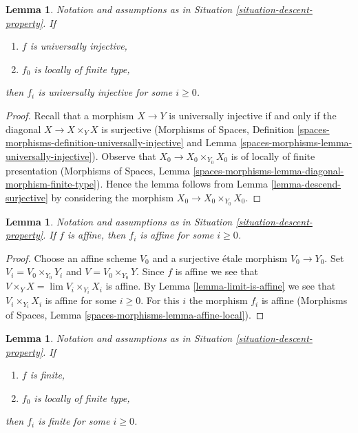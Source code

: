 \documentclass{stacks-project}
\theoremstyle{plain}
\newtheorem{lemma}[subsection]{Lemma}
\theoremstyle{definition}
\theoremstyle{remark}
\numberwithin{equation}{subsection}
\def\lim{\mathop{\mathrm{lim}}\nolimits}
\begin{document}
\begin{lemma}
\label{lemma-descend-universally-injective}
Notation and assumptions as in Situation \ref{situation-descent-property}. If
\begin{enumerate}
\item $f$ is universally injective,
\item $f_0$ is locally of finite type,
\end{enumerate}
then $f_i$ is universally injective for some $i \geq 0$.
\end{lemma}

\begin{proof}
Recall that a morphism $X \to Y$ is universally injective if and
only if the diagonal $X \to X \times_Y X$ is surjective
(Morphisms of Spaces, Definition
\ref{spaces-morphisms-definition-universally-injective} and
Lemma \ref{spaces-morphisms-lemma-universally-injective}).
Observe that $X_0 \to X_0 \times_{Y_0} X_0$ is of locally of finite
presentation (Morphisms of Spaces, Lemma
\ref{spaces-morphisms-lemma-diagonal-morphism-finite-type}).
Hence the lemma follows from Lemma \ref{lemma-descend-surjective}
by considering the morphism $X_0 \to X_0 \times_{Y_0} X_0$.
\end{proof}

\begin{lemma}
\label{lemma-descend-affine}
Notation and assumptions as in Situation \ref{situation-descent-property}. If
$f$ is affine, then $f_i$ is affine for some $i \geq 0$.
\end{lemma}

\begin{proof}
Choose an affine scheme $V_0$ and a surjective \'etale morphism $V_0 \to Y_0$.
Set $V_i = V_0 \times_{Y_0} Y_i$ and $V = V_0 \times_{Y_0} Y$.
Since $f$ is affine we see that $V \times_Y X = \lim V_i \times_{Y_i} X_i$
is affine. By Lemma \ref{lemma-limit-is-affine} we see that
$V_i \times_{Y_i} X_i$ is affine for some $i \geq 0$. For this $i$ the morphism
$f_i$ is affine
(Morphisms of Spaces, Lemma \ref{spaces-morphisms-lemma-affine-local}).
\end{proof}

\begin{lemma}
\label{lemma-descend-finite}
Notation and assumptions as in Situation \ref{situation-descent-property}. If
\begin{enumerate}
\item $f$ is finite,
\item $f_0$ is locally of finite type,
\end{enumerate}
then $f_i$ is finite for some $i \geq 0$.
\end{lemma}
\end{document}
